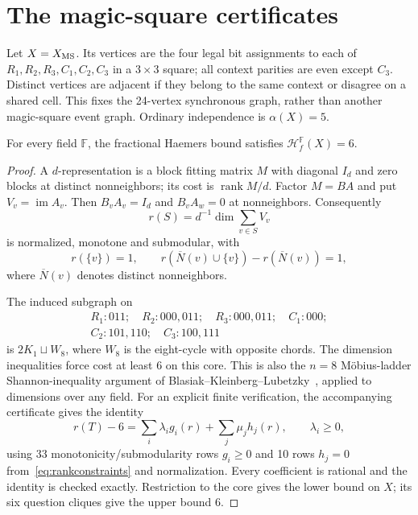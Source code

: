 \section{The magic-square certificates}\label{sec:ms}
Let $X=X_{\rm MS}$. Its vertices are the four legal bit assignments to
each of $R_1,R_2,R_3,C_1,C_2,C_3$ in a $3\times3$ square; all context
parities are even except $C_3$. Distinct vertices are adjacent if they
belong to the same context or disagree on a shared cell. This fixes the
24-vertex synchronous graph, rather than another magic-square event
graph. Ordinary independence is $\alpha(X)=5$.

\begin{proposition}\label{prop:haemers}
For every field $\mathbb F$, the fractional Haemers bound satisfies
$\mathcal H_f^{\mathbb F}(X)=6$.
\end{proposition}
\begin{proof}
A $d$-representation is a block fitting matrix $M$ with diagonal $I_d$
and zero blocks at distinct nonneighbors; its cost is $\operatorname{rank}M/d$.
Factor $M=BA$ and put $V_v=\operatorname{im}A_v$. Then
$B_vA_v=I_d$ and $B_vA_w=0$ at nonneighbors. Consequently
\[
 r(S)=d^{-1}\dim\sum_{v\in S}V_v
\]
is normalized, monotone and submodular, with
\begin{equation}\label{eq:rankconstraints}
 r(\{v\})=1,\qquad
 r(\overline N(v)\cup\{v\})-r(\overline N(v))=1,
\end{equation}
where $\overline N(v)$ denotes distinct nonneighbors.

The induced subgraph on
\[
\begin{gathered}
 R_1:011;\quad R_2:000,011;\quad R_3:000,011;\quad C_1:000;\\
 C_2:101,110;\quad C_3:100,111
\end{gathered}
\]
is $2K_1\sqcup W_8$, where $W_8$ is the eight-cycle with opposite
chords. The dimension inequalities force cost at least $6$ on this core.
This is also the $n=8$ M\"obius-ladder Shannon-inequality argument of
Blasiak--Kleinberg--Lubetzky~\cite[Theorem~5.2 and proof]{BKL}, applied
to dimensions over any field. For an explicit finite verification, the
accompanying certificate gives the identity
\begin{equation}\label{eq:dual}
 r(T)-6=\sum_i\lambda_i g_i(r)+\sum_j\mu_j h_j(r),
 \qquad \lambda_i\geq0,
\end{equation}
using 33 monotonicity/submodularity rows $g_i\geq0$ and 10 rows
$h_j=0$ from~\eqref{eq:rankconstraints} and normalization.
Every coefficient is rational and the identity is checked exactly.
Restriction to the core gives the lower bound on $X$; its six question
cliques give the upper bound $6$.
\end{proof}
